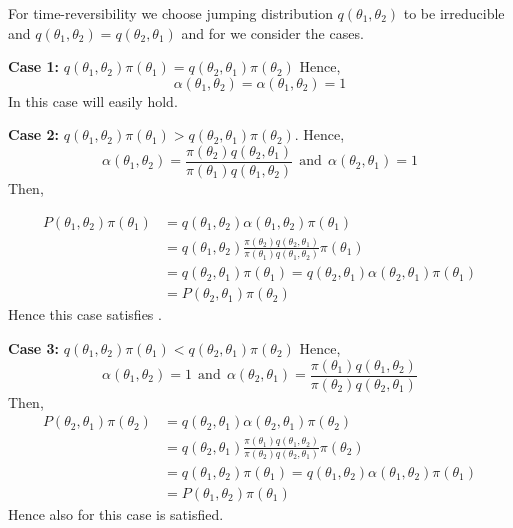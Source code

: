 For time-reversibility we choose jumping distribution $ q(\theta_1,\theta_2) $ to be irreducible and $ q(\theta_1,\theta_2) = q(\theta_2,\theta_1) $ and for  we consider the cases.

\textbf{Case 1:} $ q(\theta_1,\theta_2)\pi(\theta_1) = q(\theta_2,\theta_1)\pi(\theta_2)$
Hence, $$ \alpha(\theta_1,\theta_2) = \alpha(\theta_1,\theta_2) = 1 $$
In this case  will easily hold.

\textbf{Case 2:} $ q(\theta_1,\theta_2)\pi(\theta_1) > q(\theta_2,\theta_1)\pi(\theta_2)$.
Hence,
\[
	\alpha(\theta_1,\theta_2) = \frac{\pi(\theta_2)q(\theta_2,\theta_1)}{\pi(\theta_1)q(\theta_1,\theta_2)} \ \ \text{and} \ \ \alpha(\theta_2,\theta_1) = 1
\]
Then,

\begin{align*}
	P(\theta_1,\theta_2)\pi(\theta_1) & = q(\theta_1,\theta_2)\alpha(\theta_1,\theta_2) \pi(\theta_1)                                                    \\
	                                  & = q(\theta_1,\theta_2) \frac{\pi(\theta_2)q(\theta_2,\theta_1)}{\pi(\theta_1)q(\theta_1,\theta_2)} \pi(\theta_1) \\
	                                  & = q(\theta_2,\theta_1) \pi(\theta_1) = q(\theta_2,\theta_1) \alpha(\theta_2,\theta_1) \pi(\theta_1)              \\
	                                  & = P(\theta_2,\theta_1) \pi(\theta_2)
\end{align*}
Hence this case satisfies .

\textbf{Case 3:} $ q(\theta_1,\theta_2)\pi(\theta_1) < q(\theta_2,\theta_1)\pi(\theta_2)$
Hence,
\[
	\alpha(\theta_1,\theta_2) = 1  \ \ \text{and} \ \  \alpha(\theta_2,\theta_1) = \frac{\pi(\theta_1)q(\theta_1,\theta_2)}{\pi(\theta_2)q(\theta_2,\theta_1)}
\]
Then,
\begin{align*}
	P(\theta_2,\theta_1)\pi(\theta_2) & = q(\theta_2,\theta_1)\alpha(\theta_2,\theta_1)\pi(\theta_2)                                                     \\
	                                  & = q(\theta_2,\theta_1) \frac{\pi(\theta_1)q(\theta_1,\theta_2)}{\pi(\theta_2)q(\theta_2,\theta_1)} \pi(\theta_2) \\
	                                  & = q(\theta_1,\theta_2) \pi(\theta_1) = q(\theta_1,\theta_2) \alpha(\theta_1,\theta_2) \pi(\theta_1)              \\
	                                  & =P(\theta_1,\theta_2) \pi(\theta_1)
\end{align*}
Hence also for this case  is satisfied.

